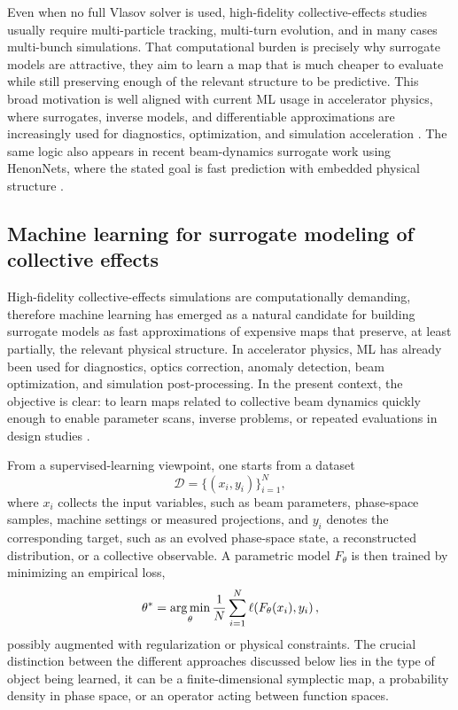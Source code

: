 \documentclass[11pt,a4paper]{article}
\begin{document}
\begin{sloppypar}
Even when no full Vlasov solver is used, high-fidelity collective-effects studies usually require multi-particle tracking, multi-turn evolution, and in many cases multi-bunch simulations. That computational burden is precisely why surrogate models are attractive, they aim to learn a map that is much cheaper to evaluate while still preserving enough of the relevant structure to be predictive. This broad motivation is well aligned with current ML usage in accelerator physics, where surrogates, inverse models, and differentiable approximations are increasingly used for diagnostics, optimization, and simulation acceleration \cite{arpaia_machine_2021}. The same logic also appears in recent beam-dynamics surrogate work using HenonNets, where the stated goal is fast prediction with embedded physical structure \cite{huang_symplectic_2024}.





\subsection{Machine learning for surrogate modeling of collective effects}

High-fidelity collective-effects simulations are computationally demanding, therefore machine learning has emerged as a natural candidate for building surrogate models as fast approximations of expensive maps that preserve, at least partially, the relevant physical structure. In accelerator physics, ML has already been used for diagnostics, optics correction, anomaly detection, beam optimization, and simulation post-processing. In the present context, the objective is clear: to learn maps related to collective beam dynamics quickly enough to enable parameter scans, inverse problems, or repeated evaluations in design studies \cite{arpaia_machine_2021}.

From a supervised-learning viewpoint, one starts from a dataset
\begin{equation}
\mathcal D = \{(x_i,y_i)\}_{i=1}^{N},
\end{equation}
where $x_i$ collects the input variables, such as beam parameters, phase-space samples, machine settings or measured projections, and $y_i$ denotes the corresponding target, such as an evolved phase-space state, a reconstructed distribution, or a collective observable. A parametric model $F_{\theta}$ is then trained by minimizing an empirical loss,
\begin{equation}
\theta ^* =\operatorname*{arg\,min}_{\theta} \frac{1}{N}\sum_{i=1}^{N}\ell\!\left(F_{\theta}(x_i),y_i\right),
\label{eq:generic_ml_loss}
\end{equation}
possibly augmented with regularization or physical constraints. The crucial distinction between the different approaches discussed below lies in the type of object being learned, it can be a finite-dimensional symplectic map, a probability density in phase space, or an operator acting between function spaces.



\end{sloppypar}
\end{document}
